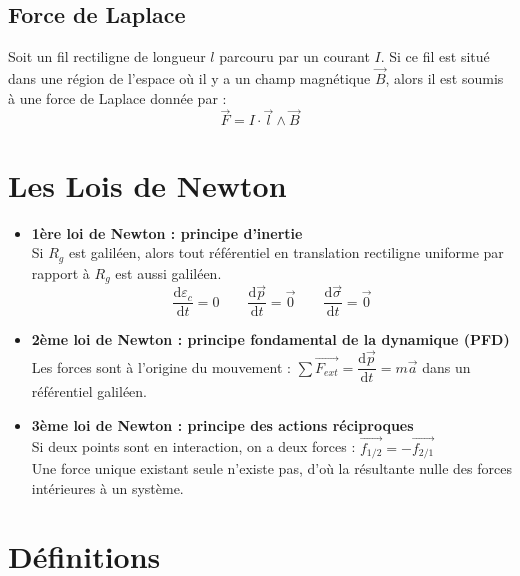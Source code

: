 \documentclass[a4paper,12pt]{article}
\newcommand{\diff}{\mathrm{d}} %
\renewcommand{\vec}{\overrightarrow}  %
\begin{document}
\begin{multicols}{2}
        \subsection{Force de Laplace}
            Soit un fil rectiligne de longueur $l$ parcouru par un 
            courant $I$. Si ce fil est situé dans une région de 
            l'espace où il y a un champ magnétique $\vec{B}$, alors il 
            est soumis à une force de Laplace donnée par :
            $$ \vec{F} = I \cdot \vec{l} \wedge \vec{B} $$
    
    \end{multicols}

    \section{Les Lois de Newton}

        \begin{itemize}[label=$\bullet$]
            \item \textbf{1ère loi de Newton : principe d'inertie}\\
            Si $R_g$ est galiléen, alors tout référentiel en translation
            rectiligne uniforme par rapport à $R_g$ est aussi galiléen.
                $$ \frac{\diff \varepsilon_c}{\diff t} = 0 \quad\quad \frac{\diff \vec{p}}{\diff t} = \vec{0} \quad\quad \frac{\diff \vec{\sigma}}{\diff t} = \vec{0} $$

            \item \textbf{2ème loi de Newton : principe fondamental de la dynamique (PFD)} \\
            Les forces sont à l'origine du mouvement : $\sum \vec{F_{ext}} = \dfrac{\diff \vec p}{\diff t} = m \vec{a}$ dans un référentiel galiléen.

            \item \textbf{3ème loi de Newton : principe des actions réciproques} \\
            Si deux points sont en interaction, on a deux forces : $\vec{f_{1/2}} = - \vec{f_{2/1}}$\\
            Une force unique existant seule n'existe pas, d'où la résultante nulle des forces intérieures à un système.
        \end{itemize}


    \section{Définitions}
\end{document}
